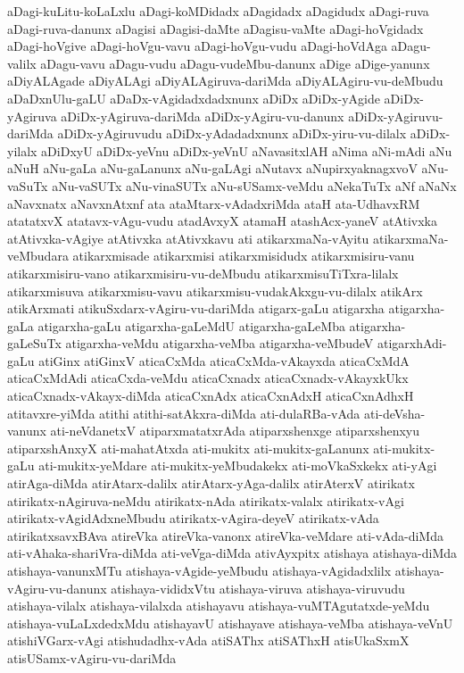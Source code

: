 {aDagi-kuLitu-koLaLxlu
aDagi-koMDidadx
aDagidadx
aDagidudx
aDagi-ruva
aDagi-ruva-danunx
aDagisi
aDagisi-daMte
aDagisu-vaMte
aDagi-hoVgidadx
aDagi-hoVgive
aDagi-hoVgu-vavu
aDagi-hoVgu-vudu
aDagi-hoVdAga
aDagu-valilx
aDagu-vavu
aDagu-vudu
aDagu-vudeMbu-danunx
aDige
aDige-yanunx
aDiyALAgade
aDiyALAgi
aDiyALAgiruva-dariMda
aDiyALAgiru-vu-deMbudu
aDaDxnUlu-gaLU
aDaDx-vAgidadxdadxnunx
aDiDx
aDiDx-yAgide
aDiDx-yAgiruva
aDiDx-yAgiruva-dariMda
aDiDx-yAgiru-vu-danunx
aDiDx-yAgiruvu-dariMda
aDiDx-yAgiruvudu
aDiDx-yAdadadxnunx
aDiDx-yiru-vu-dilalx
aDiDx-yilalx
aDiDxyU
aDiDx-yeVnu
aDiDx-yeVnU
aNavasitxlAH
aNima
aNi-mAdi
aNu
aNuH
aNu-gaLa
aNu-gaLanunx
aNu-gaLAgi
aNutavx
aNupirxyaknagxvoV
aNu-vaSuTx
aNu-vaSUTx
aNu-vinaSUTx
aNu-sUSamx-veMdu
aNekaTuTx
aNf
aNaNx
aNavxnatx
aNavxnAtxnf
ata
ataMtarx-vAdadxriMda
ataH
ata-UdhavxRM
atatatxvX
atatavx-vAgu-vudu
atadAvxyX
atamaH
atashAcx-yaneV
atAtivxka
atAtivxka-vAgiye
atAtivxka
atAtivxkavu
ati
atikarxmaNa-vAyitu
atikarxmaNa-veMbudara
atikarxmisade
atikarxmisi
atikarxmisidudx
atikarxmisiru-vanu
atikarxmisiru-vano
atikarxmisiru-vu-deMbudu
atikarxmisuTiTxra-lilalx
atikarxmisuva
atikarxmisu-vavu
atikarxmisu-vudakAkxgu-vu-dilalx
atikArx
atikArxmati
atikuSxdarx-vAgiru-vu-dariMda
atigarx-gaLu
atigarxha
atigarxha-gaLa
atigarxha-gaLu
atigarxha-gaLeMdU
atigarxha-gaLeMba
atigarxha-gaLeSuTx
atigarxha-veMdu
atigarxha-veMba
atigarxha-veMbudeV
atigarxhAdi-gaLu
atiGinx
atiGinxV
aticaCxMda
aticaCxMda-vAkayxda
aticaCxMdA
aticaCxMdAdi
aticaCxda-veMdu
aticaCxnadx
aticaCxnadx-vAkayxkUkx
aticaCxnadx-vAkayx-diMda
aticaCxnAdx
aticaCxnAdxH
aticaCxnAdhxH
atitavxre-yiMda
atithi
atithi-satAkxra-diMda
ati-dulaRBa-vAda
ati-deVsha-vanunx
ati-neVdanetxV
atiparxmatatxrAda
atiparxshenxge
atiparxshenxyu
atiparxshAnxyX
ati-mahatAtxda
ati-mukitx
ati-mukitx-gaLanunx
ati-mukitx-gaLu
ati-mukitx-yeMdare
ati-mukitx-yeMbudakekx
ati-moVkaSxkekx
ati-yAgi
atirAga-diMda
atirAtarx-dalilx
atirAtarx-yAga-dalilx
atirAterxV
atirikatx
atirikatx-nAgiruva-neMdu
atirikatx-nAda
atirikatx-valalx
atirikatx-vAgi
atirikatx-vAgidAdxneMbudu
atirikatx-vAgira-deyeV
atirikatx-vAda
atirikatxsavxBAva
atireVka
atireVka-vanonx
atireVka-veMdare
ati-vAda-diMda
ati-vAhaka-shariVra-diMda
ati-veVga-diMda
ativAyxpitx
atishaya
atishaya-diMda
atishaya-vanunxMTu
atishaya-vAgide-yeMbudu
atishaya-vAgidadxlilx
atishaya-vAgiru-vu-danunx
atishaya-vididxVtu
atishaya-viruva
atishaya-viruvudu
atishaya-vilalx
atishaya-vilalxda
atishayavu
atishaya-vuMTAgutatxde-yeMdu
atishaya-vuLaLxdedxMdu
atishayavU
atishayave
atishaya-veMba
atishaya-veVnU
atishiVGarx-vAgi
atishudadhx-vAda
atiSAThx
atiSAThxH
atisUkaSxmX
atisUSamx-vAgiru-vu-dariMda
}
